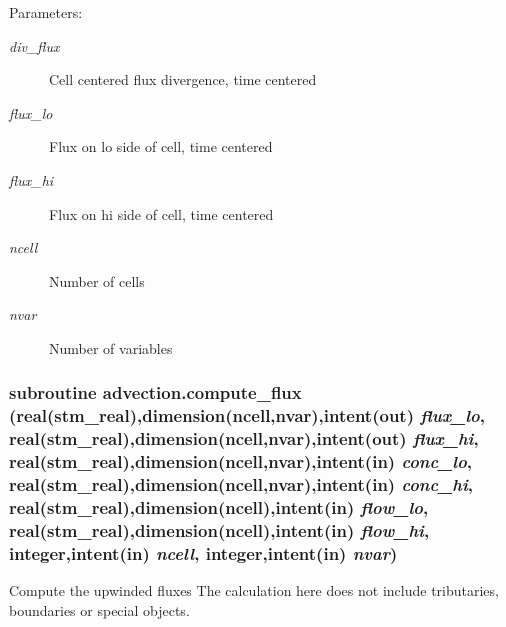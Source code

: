 \begin{Desc}
\item[Parameters:]
\begin{description}
\item[{\em div\_\-flux}]Cell centered flux divergence, time centered\item[{\em flux\_\-lo}]Flux on lo side of cell, time centered\item[{\em flux\_\-hi}]Flux on hi side of cell, time centered \item[{\em ncell}]Number of cells\item[{\em nvar}]Number of variables \end{description}
\end{Desc}
\hypertarget{a00052_3947a8a29b1c666b2d1b7223215e9873}{
\subsubsection[{compute\_\-flux}]{\setlength{\rightskip}{0pt plus 5cm}subroutine advection.compute\_\-flux (real(stm\_\-real),dimension(ncell,nvar),intent(out) {\em flux\_\-lo}, \/  real(stm\_\-real),dimension(ncell,nvar),intent(out) {\em flux\_\-hi}, \/  real(stm\_\-real),dimension(ncell,nvar),intent(in) {\em conc\_\-lo}, \/  real(stm\_\-real),dimension(ncell,nvar),intent(in) {\em conc\_\-hi}, \/  real(stm\_\-real),dimension(ncell),intent(in) {\em flow\_\-lo}, \/  real(stm\_\-real),dimension(ncell),intent(in) {\em flow\_\-hi}, \/  integer,intent(in) {\em ncell}, \/  integer,intent(in) {\em nvar})}}
\label{a00052_3947a8a29b1c666b2d1b7223215e9873}


Compute the upwinded fluxes The calculation here does not include tributaries, boundaries or special objects. 

